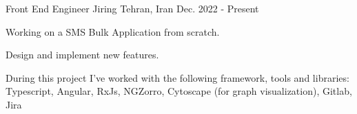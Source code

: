 \begin{cventries}


\cventry
{Front End Engineer} %
{Jiring} %
{Tehran, Iran} %
{Dec. 2022 - Present} %
{
	\begin{cvitems} %
		\item {Working on a SMS Bulk Application from scratch.}
		\item {Design and implement new features.}
		\item {During this project I've worked with the following framework, tools and libraries: Typescript, Angular, RxJs, NGZorro, Cytoscape (for graph visualization), Gitlab, Jira}
	\end{cvitems}
}

\end{cventries}
